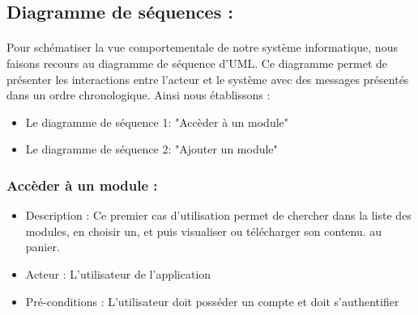 \documentclass{article}
\begin{document}
{\subsection{Diagramme de séquences :}
\onehalfspacing\paragraph{}{Pour schématiser la vue comportementale de notre système informatique, nous faisons recours au diagramme
de séquence d'UML. Ce diagramme permet de présenter les interactions entre l'acteur et le système avec des
messages présentés dans un ordre chronologique. Ainsi nous établissons :
\vspace{0.2cm}
     \begin{itemize}[label=\textbullet]
        \item Le diagramme de séquence 1: "Accèder à un module"
        \item Le diagramme de séquence 2: "Ajouter un module"
    \end{itemize}
}
\subsubsection{Accèder à un module :}
\begin{itemize}[label=\textbullet]
        \item Description : Ce premier cas d'utilisation permet de chercher dans la liste des modules, en choisir un, et puis visualiser ou télécharger son contenu.
au panier.
        \item Acteur : L'utilisateur de l'application
        \item Pré-conditions : L'utilisateur doit posséder un compte et doit s'authentifier


\end{itemize}}
\end{document}
